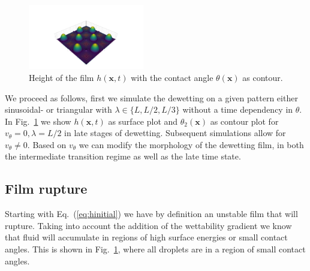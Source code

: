 \documentclass[twocolumn,amsmath,amssymb,showpacs,pre,nofootinbib,superscriptaddress]{revtex4-1} %
\begin{document}
\begin{figure}
    \centering
    \includegraphics[width=0.45\textwidth]{Figures/makie_try2.png}
    \caption{Height of the film $h(\mathbf{x},t)$ with the contact angle $\theta(\mathbf{x})$ as contour.}
    \label{fig:handtheta}
\end{figure}
We proceed as follows, first we simulate the dewetting on a given pattern either sinusoidal- or triangular with $\lambda \in \{L, L/2, L/3\}$ without a time dependency in $\theta$.
In Fig.~\ref{fig:handtheta} we show $h(\mathbf{x},t)$ as surface plot and $\theta_2(\mathbf{x})$ as contour plot for $v_{\theta} = 0, \lambda = L/2$ in late stages of dewetting.
Subsequent simulations allow for $v_{\theta} \ne 0$.  
Based on $v_{\theta}$ we can modify the morphology of the dewetting film, in both the intermediate transition regime as well as the late time state.

\subsection{Film rupture}\label{subsec:earlyT}
Starting with Eq.~(\ref{eq:hinitial}) we have by definition an unstable film that will rupture.
Taking into account the addition of the wettability gradient we know that fluid will accumulate in regions of high surface energies or small contact angles.
This is shown in Fig.~\ref{fig:handtheta}, where all droplets are in a region of small contact angles.
\end{document}
